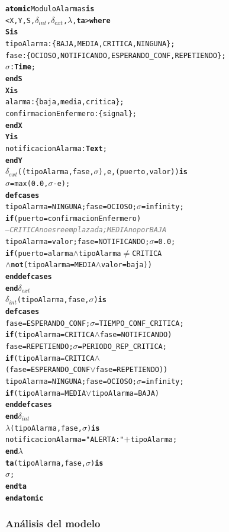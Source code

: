 \documentclass[12pt,a4paper]{article}
\newcommand{\cmlplus}{$+$}
\newcommand{\cmlwedge}{$\wedge$}
\newcommand{\cmlneq}{$\neq$}
\newcommand{\cmlvee}{$\vee$}
\newcommand{\kw}[1]{\textbf{#1}}
\newcommand{\cmlTime}{\textbf{Time}}
\newcommand{\cmlsigma}{$\sigma$}
\newcommand{\dint}{$\delta_{\mathit{int}}$}
\newcommand{\dext}{$\delta_{\mathit{ext}}$}
\newcommand{\clambda}{$\lambda$}
\newcommand{\cmlta}{\textbf{ta}}
\newcommand{\cmlcomment}[1]{\textit{\textcolor{gray}{#1}}}
\newenvironment{cmldevs}{%
  \begin{alltt}\small%
}{%
  \end{alltt}%
}
\begin{document}
\begin{center}
\begin{cmldevs}
\kw{atomic} ModuloAlarmas \kw{is}
    <X, Y, S, \dint{}, \dext{}, \clambda{}, \cmlta{}> \kw{where}
\kw{S is}
    tipoAlarma : \{BAJA, MEDIA, CRITICA, NINGUNA\};
    fase       : \{OCIOSO, NOTIFICANDO, ESPERANDO\_CONF, REPETIENDO\};
    \cmlsigma{}      : \cmlTime{};
\kw{end S}
\kw{X is}
    alarma                : \{baja, media, critica\};
    confirmacionEnfermero : \{signal\};
\kw{end X}
\kw{Y is}
    notificacionAlarma : \kw{Text};
\kw{end Y}
\dext{}((tipoAlarma, fase, \cmlsigma{}), e, (puerto, valor)) \kw{is}
    \cmlsigma{} = max(0.0, \cmlsigma{} - e);
    \kw{defcases}
        tipoAlarma = NINGUNA; fase = OCIOSO; \cmlsigma{} = infinity;
            \kw{if} (puerto = confirmacionEnfermero)
        \cmlcomment{-- CRITICA no es reemplazada; MEDIA no por BAJA}
        tipoAlarma = valor; fase = NOTIFICANDO; \cmlsigma{} = 0.0;
            \kw{if} (puerto = alarma \cmlwedge{} tipoAlarma \cmlneq{} CRITICA
                \cmlwedge{} \kw{not}(tipoAlarma = MEDIA \cmlwedge{} valor = baja))
    \kw{end defcases}
\kw{end} \dext{}
\dint{}(tipoAlarma, fase, \cmlsigma{}) \kw{is}
    \kw{defcases}
        fase = ESPERANDO\_CONF; \cmlsigma{} = TIEMPO\_CONF\_CRITICA;
            \kw{if} (tipoAlarma = CRITICA \cmlwedge{} fase = NOTIFICANDO)
        fase = REPETIENDO; \cmlsigma{} = PERIODO\_REP\_CRITICA;
            \kw{if} (tipoAlarma = CRITICA \cmlwedge{}
            (fase = ESPERANDO\_CONF \cmlvee{} fase = REPETIENDO))
        tipoAlarma = NINGUNA; fase = OCIOSO; \cmlsigma{} = infinity;
            \kw{if} (tipoAlarma = MEDIA \cmlvee{} tipoAlarma = BAJA)
    \kw{end defcases}
\kw{end} \dint{}
\clambda{}(tipoAlarma, fase, \cmlsigma{}) \kw{is}
    notificacionAlarma = "ALERTA: " \cmlplus{} tipoAlarma;
\kw{end} \clambda{}
\cmlta{}(tipoAlarma, fase, \cmlsigma{}) \kw{is}
    \cmlsigma{};
\kw{end} \cmlta{}
\kw{end atomic}
\end{cmldevs}
\label{fig:modulo-alarmas}
\end{center}

\subsubsection*{Análisis del modelo}
\end{document}
